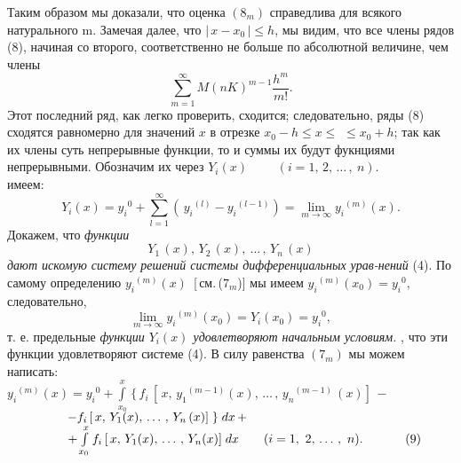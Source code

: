 \documentclass[10pt, a5paper]{book}
\let\emph\textit
\begin{document}
\noindent Таким образом мы доказали, что оценка $(8_m)$ справедлива для всякого \linebreak
натурального m. Замечая далее, что $\vert \, x-x_0 \, \vert\leqslant h$, мы видим, что все \linebreak
члены рядов (8), начиная со второго, соответственно не больше по \linebreak
абсолютной величине, чем члены 
$$\sum\limits_{m=1}^{\infty} M(nK)^{m-1}\frac{h^m}{m!}.$$
Этот последний ряд, как легко проверить, сходится; следовательно,\linebreak
ряды (8) сходятся равномерно для значений $x$ в отрезке $x_0-h\leqslant x\leqslant$ \linebreak
$\leqslant x_0+h$; так как их члены суть непрерывные функции, то и суммы\linebreak
их будут фукнциями непрерывными. Обозначим их через $Y_i(x)$\linebreak
$\qquad (i=1, \, 2, \, \dots \, , \ n)$. \\
 имеем:
$$Y_i(x)=y_i{}^{0}+\sum\limits_{l=1}^{\infty}( \, y_i{}^{(l)}-y_i{}^{(l-1)})=\lim_{m\to\infty}y_i{}^{(m)}(x).$$
Докажем, что \emph{функции} \\
$$Y_1 \,(x), \, Y_2 \,(x), \ \dots \, , \, Y_n \,(x)$$
\emph{дают искомую систему решений системы дифференциальных урав-\linebreak нений} (4).
\newpage
По самому определению $y_i{}^{(m)}(x)$ \,[\,см.\,($7_m$)] мы имеем $y_i{}^{(m)}(x_0)=y_i{}^{0},$\linebreak
следовательно, \\
$$\lim_{m\to\infty} y_i{}^{(m)}(x_0)=Y_i(x_0)=y_i{}^{0},$$
т. е. предельные \emph{функции $Y_i(x)$ удовлетворяют начальным условиям.}\linebreak
{}, что эти функции удовлетворяют системе (4). В силу \linebreak равенства $(7_m)$ мы можем написать: \\

\noindent$y_i{}^{(m)}(x)=y_i{}^{0}+\int\limits_{x_0}^{x} \,\{\,f_i\,[\,x, \, y_1{}^{(m-1)}(x), \, \dots \, , \, y_n{}^{(m-1)}\,(x)]\,-$ \\

$\hspace{1.7cm}-f_i\,[\,x, \, Y_1(x), \, \dots \, , \, Y_n\,(x)]\;\} \;dx \,+ $\\

$\hspace{1.7cm}+\int\limits_{x_0}^{x}f_i\,[\,x,\, Y_1(x), \,  \dots \, , \, Y_n(x)] \; dx \qquad (i=1, \ 2, \, \dots \, , \ n). \hspace{1.2cm}(9)$ 
\end{document}
